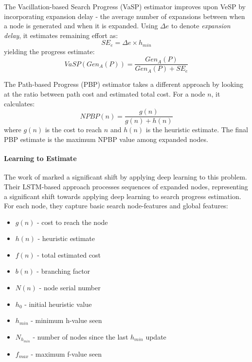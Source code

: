 \documentclass[letterpaper]{article}
\begin{document}
The Vacillation-based Search Progress (VaSP) estimator improves upon VeSP by incorporating expansion delay - the average number of expansions between when a node is generated and when it is expanded. Using $\Delta e$ to denote \emph{expansion delay}, it estimates remaining effort as:
\begin{equation*}
    SE_e = \Delta e \times h_{min}
\end{equation*}
yielding the progress estimate:
\begin{equation}
    VaSP(Gen_A(P)) = \frac{Gen_A(P)}{Gen_A(P) + SE_e}
\end{equation}

The Path-based Progress (PBP) estimator takes a different approach by looking at the ratio between path cost and estimated total cost. For a node $n$, it calculates:
\begin{equation}
    NPBP(n) = \frac{g(n)}{g(n) + h(n)}
\end{equation}
where $g(n)$ is the cost to reach $n$ and $h(n)$ is the heuristic estimate. The final PBP estimate is the maximum NPBP value among expanded nodes.

\paragraph{Learning to Estimate}\label{para:learning-to-estimate}
The work of \citet{sudry2022learning} marked a significant shift by applying deep learning to this problem. Their LSTM-based approach processes sequences of expanded nodes, representing a significant shift towards applying deep learning to search progress estimation. For each node, they capture basic search node-features and global features:

\begin{itemize}
    \item $g(n)$ - cost to reach the node
    \item $h(n)$ - heuristic estimate
    \item $f(n)$ - total estimated cost
    \item $b(n)$ - branching factor
    \item $N(n)$ - node serial number
    \item $h_0$ - initial heuristic value
    \item $h_{min}$ - minimum h-value seen
    \item $N_{h_{min}}$ - number of nodes since the last $h_{min}$ update
    \item $f_{max}$ - maximum f-value seen
\end{itemize}
\end{document}
